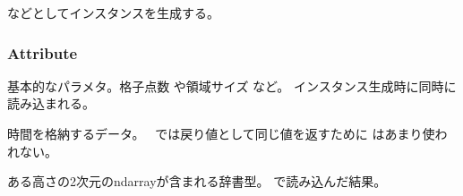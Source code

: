 \documentclass[letterpaper,10pt,dvipdfmx,report]{sphinxmanual}
\begin{document}
\sphinxAtStartPar
などとしてインスタンスを生成する。


\subsubsection{Attribute}
\label{\detokenize{io:attribute}}

\begin{fulllineitems}
\label{\detokenize{io:R2D2.R2D2_data.p}}
\pysigstartsignatures
{}
\pysigstopsignatures
\sphinxAtStartPar
基本的なパラメタ。格子点数  や領域サイズ  など。
インスタンス生成時に同時に読み込まれる。

\end{fulllineitems}


\begin{fulllineitems}
\label{\detokenize{io:R2D2.R2D2_data.t}}
\pysigstartsignatures
{}
\pysigstopsignatures
\sphinxAtStartPar
時間を格納するデータ。　{\hyperref[\detokenize{io:R2D2.R2D2_data.read_time}]{}} では戻り値として同じ値を返すために  はあまり使われない。

\end{fulllineitems}


\begin{fulllineitems}
\label{\detokenize{io:R2D2.R2D2_data.qs}}
\pysigstartsignatures
{}
\pysigstopsignatures
\sphinxAtStartPar
ある高さの2次元のndarrayが含まれる辞書型。 {\hyperref[\detokenize{io:R2D2.R2D2_data.read_qq_select}]{}} で読み込んだ結果。

\end{fulllineitems}

\end{document}
